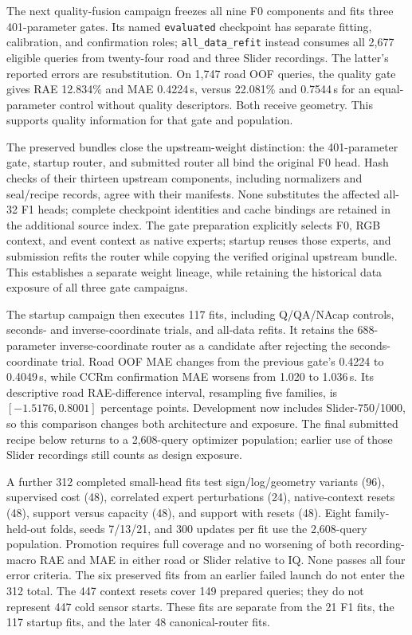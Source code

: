 The next quality-fusion campaign freezes all nine F0 components and fits three 401-parameter gates. Its named \texttt{evaluated} checkpoint has separate fitting, calibration, and confirmation roles; \texttt{all\_data\_refit} instead consumes all 2,677 eligible queries from twenty-four road and three Slider recordings. The latter's reported errors are resubstitution. On 1,747 road OOF queries, the quality gate gives RAE 12.834\% and MAE 0.4224\,s, versus 22.081\% and 0.7544\,s for an equal-parameter control without quality descriptors. Both receive geometry. This supports quality information for that gate and population. 

The preserved bundles close the upstream-weight distinction: the 401-parameter gate, startup router, and submitted router all bind the original F0 head. Hash checks of their thirteen upstream components, including normalizers and seal/recipe records, agree with their manifests. None substitutes the affected all-32 F1 heads; complete checkpoint identities and cache bindings are retained in the additional source index. The gate preparation explicitly selects F0, RGB context, and event context as native experts; startup reuses those experts, and submission refits the router while copying the verified original upstream bundle. This establishes a separate weight lineage, while retaining the historical data exposure of all three gate campaigns. 

The startup campaign then executes 117 fits, including Q/QA/NAcap controls, seconds- and inverse-coordinate trials, and all-data refits. It retains the 688-parameter inverse-coordinate router as a candidate after rejecting the seconds-coordinate trial. Road OOF MAE changes from the previous gate's 0.4224 to 0.4049\,s, while CCRm confirmation MAE worsens from 1.020 to 1.036\,s. Its descriptive road RAE-difference interval, resampling five families, is $[-1.5176,0.8001]$ percentage points. Development now includes Slider-750/1000, so this comparison changes both architecture and exposure. The final submitted recipe below returns to a 2,608-query optimizer population; earlier use of those Slider recordings still counts as design exposure. 

A further 312 completed small-head fits test sign/log/geometry variants (96), supervised cost (48), correlated expert perturbations (24), native-context resets (48), support versus capacity (48), and support with resets (48). Eight family-held-out folds, seeds 7/13/21, and 300 updates per fit use the 2,608-query population. Promotion requires full coverage and no worsening of both recording-macro RAE and MAE in either road or Slider relative to IQ. None passes all four error criteria. The six preserved fits from an earlier failed launch do not enter the 312 total. The 447 context resets cover 149 prepared queries; they do not represent 447 cold sensor starts. These fits are separate from the 21 F1 fits, the 117 startup fits, and the later 48 canonical-router fits. 

